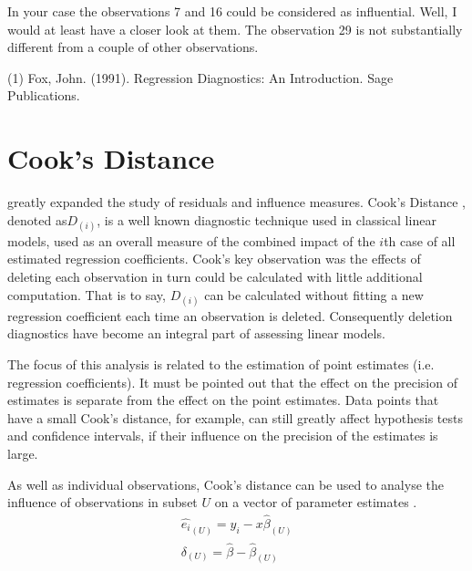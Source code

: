 \documentclass[12pt, a4paper]{article}
\begin{document}
In your case the observations 7 and 16 could be considered as influential. Well, I would at least have a closer look at them. The observation 29 is not substantially different from a couple of other observations.

(1) Fox, John. (1991). Regression Diagnostics: An Introduction. Sage Publications.






\section{Cook's Distance} %
%
\citet{cook77} greatly expanded the study of residuals and influence measures. Cook's Distance , denoted as$D_{(i)}$, is a well known diagnostic technique used in classical linear models, used as an overall measure of the combined impact of the $i$th case of all estimated regression coefficients. Cook's key observation was the effects of deleting each observation in turn could be calculated with little additional computation. That is to say, $D_{(i)}$ can be calculated without fitting a new regression coefficient each time an observation is deleted.  Consequently deletion diagnostics have become an integral part of assessing linear models. 

The focus of this analysis is related to the estimation of point estimates (i.e. regression coefficients). It must be pointed out that the effect on the precision of estimates is separate from the effect on the point estimates. Data points that
have a small Cook's distance, for example, can still greatly affect hypothesis tests and confidence intervals, if their  influence on the precision of the estimates is large.

As well as individual observations, Cook's distance can be used to analyse the influence of observations in subset $U$ on a vector of parameter estimates \citep{cook77}.
\begin{eqnarray}
\hat{e_{i}}_{(U)} = y_{i} - x\hat{\beta}_{(U)}\\
\delta_{(U)} = \hat{\beta} - \hat{\beta}_{(U)}
\end{eqnarray}
\end{document}
